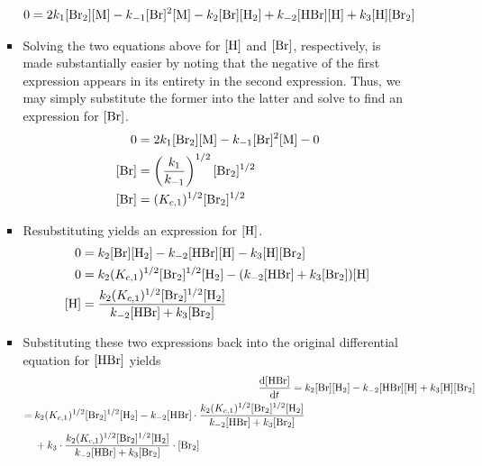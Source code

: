 \documentclass[../notes.tex]{subfiles}
\begin{document}
\begin{itemize}
\begin{itemize}
\begin{itemize}
\begin{align*}
                0 &= 2k_1[\ce{Br2}][\ce{M}]-k_{-1}[\ce{Br}]^2[\ce{M}]-k_2[\ce{Br}][\ce{H2}]+k_{-2}[\ce{HBr}][\ce{H}]+k_3[\ce{H}][\ce{Br2}]
            \end{align*}
            \item Solving the two equations above for $[\ce{H}]$ and $[\ce{Br}]$, respectively, is made substantially easier by noting that the negative of the first expression appears in its entirety in the second expression. Thus, we may simply substitute the former into the latter and solve to find an expression for $[\ce{Br}]$.
            \begin{align*}
                0 &= 2k_1[\ce{Br2}][\ce{M}]-k_{-1}[\ce{Br}]^2[\ce{M}]-0\\
                [\ce{Br}] &= \left( \frac{k_1}{k_{-1}} \right)^{1/2}[\ce{Br2}]^{1/2}\\
                [\ce{Br}] &= (K_{c,1})^{1/2}[\ce{Br2}]^{1/2}
            \end{align*}
            \item Resubstituting yields an expression for $[\ce{H}]$.
            \begin{align*}
                0 &= k_2[\ce{Br}][\ce{H2}]-k_{-2}[\ce{HBr}][\ce{H}]-k_3[\ce{H}][\ce{Br2}]\\
                0 &= k_2(K_{c,1})^{1/2}[\ce{Br2}]^{1/2}[\ce{H2}]-(k_{-2}[\ce{HBr}]+k_3[\ce{Br2}])[\ce{H}]\\
                [\ce{H}] &= \frac{k_2(K_{c,1})^{1/2}[\ce{Br2}]^{1/2}[\ce{H2}]}{k_{-2}[\ce{HBr}]+k_3[\ce{Br2}]}
            \end{align*}
            \item Substituting these two expressions back into the original differential equation for $[\ce{HBr}]$ yields
            \begin{align*}
                \dv{[\ce{HBr}]}{t} ={}& k_2[\ce{Br}][\ce{H2}]-k_{-2}[\ce{HBr}][\ce{H}]+k_3[\ce{H}][\ce{Br2}]\\
                \begin{split}
                    ={}& k_2(K_{c,1})^{1/2}[\ce{Br2}]^{1/2}[\ce{H2}]-k_{-2}[\ce{HBr}]\cdot\frac{k_2(K_{c,1})^{1/2}[\ce{Br2}]^{1/2}[\ce{H2}]}{k_{-2}[\ce{HBr}]+k_3[\ce{Br2}]}\\
                    &+k_3\cdot\frac{k_2(K_{c,1})^{1/2}[\ce{Br2}]^{1/2}[\ce{H2}]}{k_{-2}[\ce{HBr}]+k_3[\ce{Br2}]}\cdot[\ce{Br2}]
                \end{split}\\
                \begin{split}

\end{split}
\end{align*}
\end{itemize}
\end{itemize}
\end{itemize}
\end{document}
